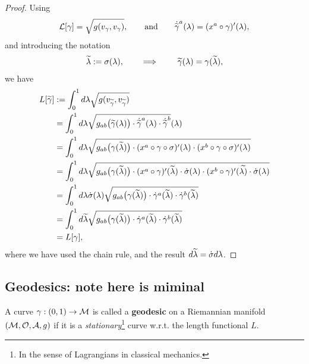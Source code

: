 \documentclass[12pt]{article} %
\begin{document}
\begin{proof}
    Using 
\begin{align*} 
    \mathcal{L}[\gamma] = \sqrt{g(v_{\gamma},v_{\gamma})}, \qquad\text{and}\qquad \dot{\widetilde{\gamma}}^a(\lambda) = (x^a\circ \gamma)'(\lambda),
\end{align*} 
and introducing the notation 
\begin{align*} 
    \widetilde{\lambda} := \sigma(\lambda), \qquad \implies \qquad \widetilde{\gamma}(\lambda) = \gamma(\widetilde{\lambda}),
\end{align*} 
we have 
\begin{align*} 
    \begin{split}
        L[\widetilde{\gamma}] & := \int_0^1 d\lambda \sqrt{g(v_{\widetilde{\gamma}},v_{\widetilde{\gamma}})} \\
        & = \int_0^1 d\lambda \sqrt{g_{ab}\big(\widetilde{\gamma}(\lambda)\big)\cdot\dot{\widetilde{\gamma}}^a(\lambda) \cdot  \dot{\widetilde{\gamma}}^b}(\lambda) \\
        & = \int_0^1 d\lambda \sqrt{g_{ab}\big(\gamma(\widetilde{\lambda})\big) \cdot (x^a\circ \gamma \circ \sigma)'(\lambda) \cdot (x^b\circ \gamma \circ \sigma)'(\lambda)} \\
        & = \int_0^1 d\lambda \sqrt{g_{ab}\big(\gamma(\widetilde{\lambda})\big) \cdot (x^a\circ \gamma)'(\widetilde{\lambda})\cdot \dot{\sigma}(\lambda) \cdot (x^b\circ \gamma)'(\widetilde{\lambda)}\cdot\dot{\sigma}(\lambda)} \\
        & = \int_0^1 d\lambda \dot{\sigma}(\lambda)\sqrt{g_{ab}\big(\gamma(\widetilde{\lambda})\big) \cdot \dot{\gamma}^a(\widetilde{\lambda}) \cdot \dot{\gamma}^b(\widetilde{\lambda})} \\
        & = \int_0^1 d\widetilde{\lambda} \sqrt{g_{ab}\big(\gamma(\widetilde{\lambda})\big) \cdot \dot{\gamma}^a(\widetilde{\lambda}) \cdot \dot{\gamma}^b(\widetilde{\lambda})} \\
        & = L[\gamma],
    \end{split}
\end{align*} 
where we have used the chain rule, and the result $d\widetilde{\lambda} = \dot{\sigma}d\lambda$.
\end{proof}

\subsection{Geodesics: note here is miminal }

\bd[Geodesic]
    A curve $\gamma:(0,1)\to\mathcal{M}$ is called a \textbf{geodesic} on a Riemannian manifold $(\mathcal{M},\mathcal{O},\mathcal{A},g)$ if it is a \textit{stationary}\footnote{In the sense of Lagrangians in classical mechanics.} curve w.r.t. the length functional $L$.
\ed
\end{document}
